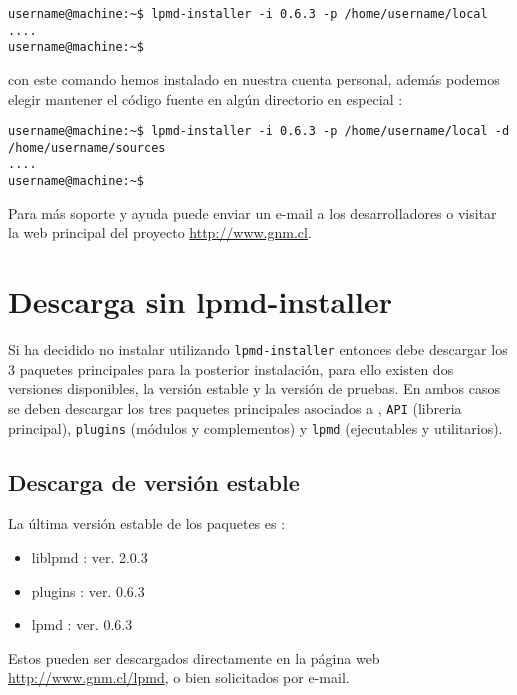 \begin{verbatim}
username@machine:~$ lpmd-installer -i 0.6.3 -p /home/username/local
....
username@machine:~$
\end{verbatim}

con este comando hemos instalado {\lpmd} en nuestra cuenta personal, adem\'as podemos elegir mantener el c\'odigo fuente en alg\'un directorio en especial :

\begin{verbatim}
username@machine:~$ lpmd-installer -i 0.6.3 -p /home/username/local -d /home/username/sources
....
username@machine:~$
\end{verbatim}

Para m\'as soporte y ayuda puede enviar un e-mail a los desarrolladores o visitar la web principal del proyecto \url{http://www.gnm.cl}.

\section{Descarga sin lpmd-installer}
\label{sec:descarga}

Si ha decidido no instalar {\lpmd} utilizando \verb|lpmd-installer| entonces debe descargar los 3 paquetes principales para la posterior instalaci\'on, para ello existen dos versiones disponibles, la versi\'on estable y la versi\'on de pruebas. En ambos casos se deben descargar los tres paquetes principales asociados a {\lpmd}, \verb|API| (libreria principal), \verb|plugins| (m\'odulos y complementos) y \verb|lpmd| (ejecutables y utilitarios).

\subsection{Descarga de versi\'on estable}

La \'ultima versi\'on estable de los paquetes es :

\begin{itemize}
 \item liblpmd : ver. 2.0.3
 \item plugins : ver. 0.6.3
 \item lpmd    : ver. 0.6.3
\end{itemize}

Estos pueden ser descargados directamente en la p\'agina web \url{http://www.gnm.cl/lpmd}, o bien solicitados por e-mail.

